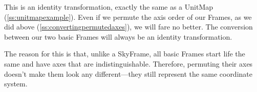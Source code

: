\documentclass[twoside,11pt]{article}
\newcommand{\htmlref}[2]{#1}
\newcommand{\secref}[1]{\S\ref{#1}}
\renewcommand{\secref}[1]{\ref{#1}}
\begin{document}
This is an identity transformation, exactly the same as a \htmlref{UnitMap}{UnitMap}
(\secref{ss:unitmapexample}). Even if we permute the axis order of our
Frames, as we did above (\secref{ss:convertingpermutedaxes}), we will
fare no better. The conversion between our two basic Frames will
always be an identity transformation.

The reason for this is that, unlike a \htmlref{SkyFrame}{SkyFrame}, all basic Frames start
life the same and have axes that are indistinguishable. Therefore,
permuting their axes doesn't make them look any different---they still
represent the same coordinate system.
%
%
%
%
%
\end{document}
